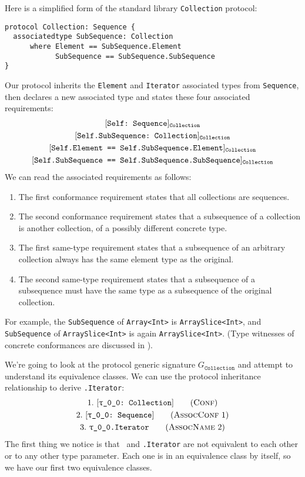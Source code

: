\documentclass[../generics]{subfiles}
\begin{document}
\begin{example}\label{protocol collection example}
Here is a simplified form of the standard library \texttt{Collection} protocol:
\begin{Verbatim}
protocol Collection: Sequence {
  associatedtype SubSequence: Collection
      where Element == SubSequence.Element
            SubSequence == SubSequence.SubSequence
}
\end{Verbatim}
Our protocol inherits the \texttt{Element} and \texttt{Iterator} associated types from \texttt{Sequence}, then declares a new associated type and states these four associated requirements:
\begin{gather*}
\AssocConfReq{Self}{Sequence}{Collection}\\
\AssocConfReq{Self.SubSequence}{Collection}{Collection}\\
\AssocSameReq{Self.Element}{Self.SubSequence.Element}{Collection}\\
\AssocSameReq{Self.SubSequence}{Self.SubSequence.SubSequence}{Collection}
\end{gather*}
We can read the associated requirements as follows:
\begin{enumerate}
\item The first conformance requirement states that all collections are sequences.
\item The second conformance requirement states that a subsequence of a collection is another collection, of a possibly different concrete type.
\item The first same-type requirement states that a subsequence of an arbitrary collection always has the same element type as the original.
\item The second same-type requirement states that a subsequence of a subsequence must have the same type as a subsequence of the original collection.
\end{enumerate}
For example, the \texttt{SubSequence} of \texttt{Array<Int>} is \texttt{ArraySlice<Int>}, and \texttt{SubSequence} of \texttt{ArraySlice<Int>} is again \texttt{ArraySlice<Int>}. (Type witnesses of concrete conformances are discussed in ).

We're going to look at the protocol generic signature $G_\texttt{Collection}$ and attempt to understand its equivalence classes. We can use the protocol inheritance relationship to derive \texttt{\rT.Iterator}:
\begin{gather*}
\ConfStep{\rT}{Collection}{1}\\
\AssocConfStep{1}{\rT}{Sequence}{2}\\
\AssocNameStep{2}{\rT.Iterator}{3}
\end{gather*}
The first thing we notice is that \rT\ and \texttt{\rT.Iterator} are not equivalent to each other or to any other type parameter. Each one is in an equivalence class by itself, so we have our first two equivalence classes.


\end{example}
\end{document}
